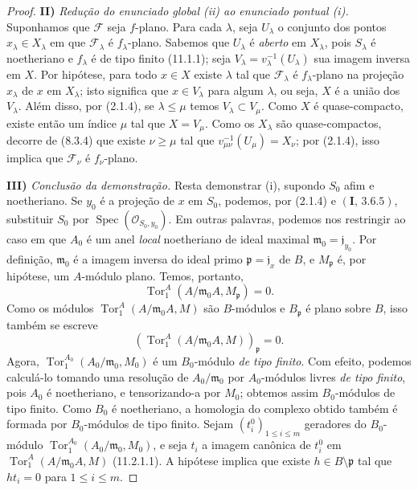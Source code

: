 \begin{proof}
\medskip
\noindent\textbf{II)} \emph{Redução do enunciado global (ii) ao enunciado pontual (i).} Suponhamos que $\mathcal F$ seja $f$-plano. Para cada $\lambda$, seja $U_\lambda$ o conjunto dos pontos $x_\lambda\in X_\lambda$ em que $\mathcal F_\lambda$ é $f_\lambda$-plano. Sabemos que $U_\lambda$ é \emph{aberto} em $X_\lambda$, pois $S_\lambda$ é noetheriano e $f_\lambda$ é de tipo finito (11.1.1); seja $V_\lambda=v_\lambda^{-1}(U_\lambda)$ sua imagem inversa em $X$. Por hipótese, para todo $x\in X$ existe $\lambda$ tal que $\mathcal F_\lambda$ é $f_\lambda$-plano na projeção $x_\lambda$ de $x$ em $X_\lambda$; isto significa que $x\in V_\lambda$ para algum $\lambda$, ou seja, $X$ é a união dos $V_\lambda$. Além disso, por (2.1.4), se $\lambda\leq\mu$ temos $V_\lambda\subset V_\mu$. Como $X$ é quase-compacto, existe então um índice $\mu$ tal que $X=V_\mu$. Como os $X_\lambda$ são quase-compactos, decorre de (8.3.4) que existe $\nu\geq\mu$ tal que $v_{\mu\nu}^{-1}(U_\mu)=X_\nu$; por (2.1.4), isso implica que $\mathcal F_\nu$ é $f_\nu$-plano.

\medskip
\noindent\textbf{III)} \emph{Conclusão da demonstração.} Resta demonstrar (i), supondo $S_0$ afim e noetheriano. Se $y_0$ é a projeção de $x$ em $S_0$, podemos, por (2.1.4) e $(\mathbf I,\,3.6.5)$, substituir $S_0$ por $\operatorname{Spec}(\mathcal O_{S_0,y_0})$. Em outras palavras, podemos nos restringir ao caso em que $A_0$ é um anel \emph{local} noetheriano de ideal maximal $\mathfrak m_0=\mathfrak j_{y_0}$. Por definição, $\mathfrak m_0$ é a imagem inversa do ideal primo $\mathfrak p=\mathfrak j_x$ de $B$, e $M_{\mathfrak p}$ é, por hipótese, um $A$-módulo plano. Temos, portanto,
\[
\operatorname{Tor}_1^A(A/\mathfrak m_0A,M_{\mathfrak p})=0.
\]
Como os módulos $\operatorname{Tor}_1^A(A/\mathfrak m_0A,M)$ são $B$-módulos e $B_{\mathfrak p}$ é plano sobre $B$, isso também se escreve
\[
(\operatorname{Tor}_1^A(A/\mathfrak m_0A,M))_{\mathfrak p}=0.
\]
Agora, $\operatorname{Tor}_1^{A_0}(A_0/\mathfrak m_0,M_0)$ é um $B_0$-módulo \emph{de tipo finito}. Com efeito, podemos calculá-lo tomando uma resolução de $A_0/\mathfrak m_0$ por $A_0$-módulos livres \emph{de tipo finito}, pois $A_0$ é noetheriano, e tensorizando-a por $M_0$; obtemos assim $B_0$-módulos de tipo finito. Como $B_0$ é noetheriano, a homologia do complexo obtido também é formada por $B_0$-módulos de tipo finito. Sejam $(t_i^0)_{1\leq i\leq m}$ geradores do $B_0$-módulo $\operatorname{Tor}_1^{A_0}(A_0/\mathfrak m_0,M_0)$, e seja $t_i$ a imagem canônica de $t_i^0$ em $\operatorname{Tor}_1^A(A/\mathfrak m_0A,M)$ (11.2.1.1). A hipótese implica que existe $h\in B\setminus\mathfrak p$ tal que $ht_i=0$ para $1\leq i\leq m$.


\end{proof}
